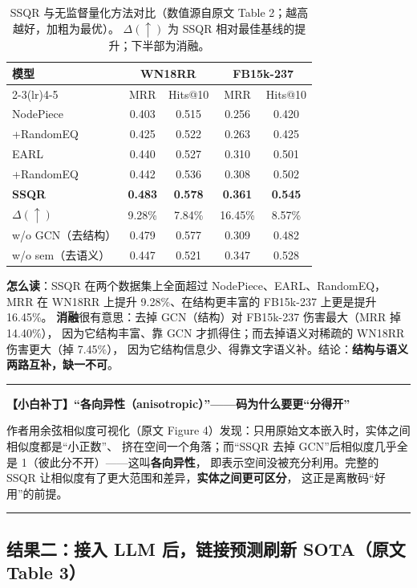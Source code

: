 \documentclass[11pt,UTF8,fontset=fandol]{ctexart}
\newenvironment{tip}[1]{%
  \par\smallskip\noindent\rule{\linewidth}{0.4pt}\par\nobreak
  \noindent\textbf{【小白补丁】#1}\par\nobreak\noindent\ignorespaces
}{%
  \par\noindent\rule{\linewidth}{0.4pt}\par\smallskip
}
\begin{document}
\begin{table}[H]\centering
\caption{SSQR 与无监督量化方法对比（数值源自原文 Table 2；越高越好，加粗为最优）。
$\Delta(\uparrow)$ 为 SSQR 相对最佳基线的提升；下半部为消融。}
\begin{tabular}{lcccc}
\toprule
\multirow{2}{*}{模型} & \multicolumn{2}{c}{WN18RR} & \multicolumn{2}{c}{FB15k-237} \\
\cmidrule(lr){2-3}\cmidrule(lr){4-5}
 & MRR & Hits@10 & MRR & Hits@10 \\
\midrule
NodePiece              & 0.403 & 0.515 & 0.256 & 0.420 \\
\quad +RandomEQ        & 0.425 & 0.522 & 0.263 & 0.425 \\
EARL                   & 0.440 & 0.527 & 0.310 & 0.501 \\
\quad +RandomEQ        & 0.442 & 0.536 & 0.308 & 0.502 \\
\textbf{SSQR}          & \textbf{0.483} & \textbf{0.578} & \textbf{0.361} & \textbf{0.545} \\
\quad $\Delta(\uparrow)$ & 9.28\% & 7.84\% & 16.45\% & 8.57\% \\
\midrule
\quad w/o GCN（去结构）   & 0.479 & 0.577 & 0.309 & 0.482 \\
\quad w/o sem（去语义）   & 0.447 & 0.521 & 0.347 & 0.528 \\
\bottomrule
\end{tabular}
\end{table}

\textbf{怎么读}：SSQR 在两个数据集上全面超过 NodePiece、EARL、RandomEQ，
MRR 在 WN18RR 上提升 9.28\%、在结构更丰富的 FB15k-237 上更是提升 16.45\%。
\textbf{消融}很有意思：去掉 GCN（结构）对 FB15k-237 伤害最大（MRR 掉 14.40\%），
因为它结构丰富、靠 GCN 才抓得住；而去掉语义对稀疏的 WN18RR 伤害更大（掉 7.45\%），
因为它结构信息少、得靠文字语义补。结论：\textbf{结构与语义两路互补，缺一不可}。

\begin{tip}{“各向异性（anisotropic）”——码为什么要更“分得开”}
作者用余弦相似度可视化（原文 Figure 4）发现：只用原始文本嵌入时，实体之间相似度都是“小正数”、
挤在空间一个角落；而“SSQR 去掉 GCN”后相似度几乎全是 1（彼此分不开）——这叫\textbf{各向异性}，
即表示空间没被充分利用。完整的 SSQR 让相似度有了更大范围和差异，\textbf{实体之间更可区分}，
这正是离散码“好用”的前提。
\end{tip}

\subsection{结果二：接入 LLM 后，链接预测刷新 SOTA（原文 Table 3）}
\end{document}
